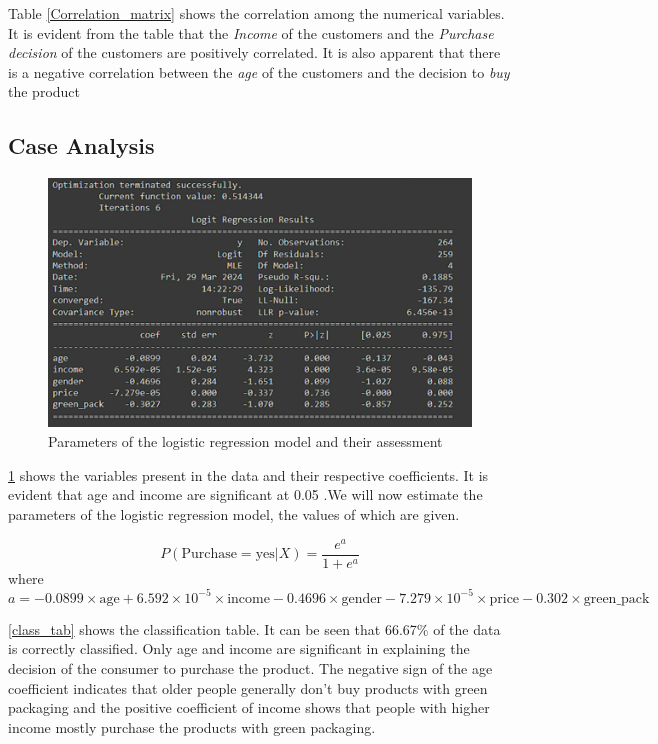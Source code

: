 \documentclass[a4paper,10pt]{article}
\begin{document}
Table \ref{Correlation_matrix} shows the correlation among the numerical variables. It is evident from the table that the \textit{Income} of the customers and the \textit{Purchase decision} of the customers are positively correlated. 
It is also apparent that there is a negative correlation between the \textit{age} of the customers and the decision to \textit{buy} the product



\subsection{Case Analysis}


\begin{figure}[ht]
\centering
\includegraphics[height=6.6cm]{figures/coeff.png}
\caption{Parameters of the logistic regression model and their assessment}
\label{fig_regression}
\label{summary_lr}
\end{figure}

\ref{summary_lr} shows the variables present in the data and their respective coefficients. It is evident that age and income are significant at 0.05 .We will now estimate the parameters of the logistic regression model, the values of which are given.

\begin{equation}
P(\text{Purchase} = \text{yes} | X) = \frac{e^{a}}{1 + e^{a}}
\label{LR_model}
\end{equation}
where
\begin{equation}
a = -0.0899 \times \text{age} + 6.592 \times 10^{-5} \times \text{income} - 0.4696 \times \text{gender} - 7.279 \times 10^{-5} \times \text{price} - 0.302 \times \text{green\_pack}
\label{LR_equation}
\end{equation}

\ref{class_tab} shows the classification table. It can be seen that 66.67\% of the data is correctly classified. Only age and income are significant in explaining the decision of the consumer to purchase the product. The negative sign of the age coefficient indicates that older people generally don't buy products with green packaging and the positive coefficient of income shows that people with higher income mostly purchase the products with green packaging.
\end{document}
